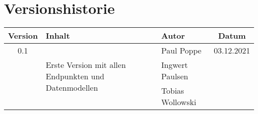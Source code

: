 \chapter*{Versionshistorie}
\begin{table}[htb]
	\begin{tabularx}{\textwidth}{|c|X|l|c|}
		\hline
\textbf{Version} & \textbf{Inhalt} & \textbf{Autor} & \textbf{Datum} \\ \hline
0.1 & \multirow{3}{*}{Erste Version mit allen Endpunkten und Datenmodellen} & Paul Poppe & 03.12.2021 \\ 
 & & Ingwert Paulsen & \\
 & & Tobias Wollowski & \\ \hline
	\end{tabularx}
\end{table}
